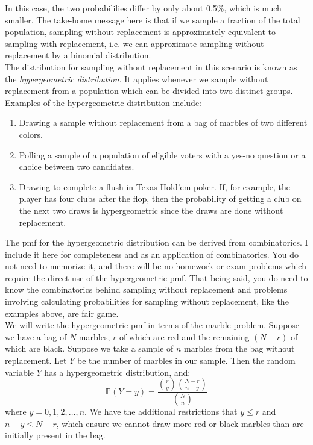 \documentclass[12pt]{article}
\theoremstyle{definition}
\theoremstyle{remark}
\def\P{{\mathbb P}}
\begin{document}
In this case, the two probabililies differ by only about 0.5\%, which is much smaller. The take-home message here is that if we sample a fraction of the total population, sampling without replacement is approximately equivalent to sampling with replacement, i.e. we can approximate sampling without replacement by a binomial distribution.\\

The distribution for sampling without replacement in this scenario is known as the \emph{hypergeometric distribution}. It applies whenever we sample without replacement from a population which can be divided into two distinct groups. Examples of the hypergeometric distribution include:
\begin{enumerate}
\item Drawing a sample without replacement from a bag of marbles of two different colors.
\item Polling a sample of a population of eligible voters with a yes-no question or a choice between two candidates.
\item Drawing to complete a flush in Texas Hold'em poker. If, for example, the player has four clubs after the flop, then the probability of getting a club on the next two draws is hypergeometric since the draws are done without replacement.
\end{enumerate}

The pmf for the hypergeometric distribution can be derived from combinatorics. I include it here for completeness and as an application of combinatorics. You do not need to memorize it, and there will be no homework or exam problems which require the direct use of the hypergeometric pmf. That being said, you do need to know the combinatorics behind sampling without replacement and problems involving calculating probabilities for sampling without replacement, like the examples above, are fair game.\\

We will write the hypergeometric pmf in terms of the marble problem. Suppose we have a bag of $N$ marbles, $r$
of which are red and the remaining $(N - r)$ of which are black. Suppose we take a sample of $n$ marbles from the bag without replacement. Let $Y$ be the number of marbles in our sample. Then the random variable $Y$ has a hypergeometric distribution, and:
\[
\P(Y = y) = \frac{ \binom{r}{y} \binom{N-r}{n-y} }{ \binom{N}{n} }
\]
where $y = 0, 1, 2, \dots, n$. We have the additional restrictions that $y \leq r$ and $n - y \leq N - r$, which ensure we cannot draw more red or black marbles than are initially present in the bag.\\
\end{document}
